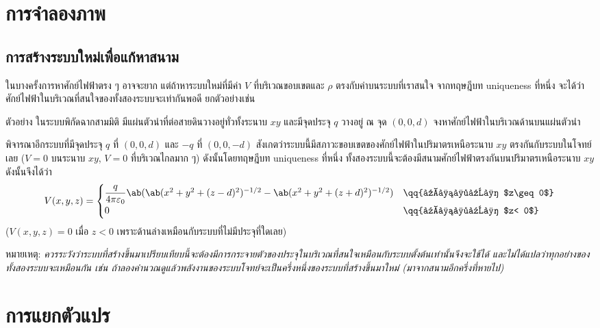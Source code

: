 \section{การจำลองภาพ}
\subsection{การสร้างระบบใหม่เพื่อแก้หาสนาม}
ในบางครั้งการหาศักย์ไฟฟ้าตรง ๆ อาจจะยาก แต่ถ้าหาระบบใหม่ที่มีค่า $V$ ที่บริเวณขอบเขตและ $\rho$ ตรงกับค่าบนระบบที่เราสนใจ จากทฤษฎีบท uniqueness ที่หนึ่ง จะได้ว่าศักย์ไฟฟ้าในบริเวณที่สนใจของทั้งสองระบบจะเท่ากันพอดี ยกตัวอย่างเช่น

\begin{corbox}{ตัวอย่าง}
    ในระบบพิกัดฉากสามมิติ มีแผ่นตัวนำที่ต่อสายดินวางอยู่ทั่วทั้งระนาบ $xy$ และมีจุดประจุ $q$ วางอยู่ ณ จุด $(0,0,d)$ จงหาศักย์ไฟฟ้าในบริเวณด้านบนแผ่นตัวนำ
\end{corbox}
\begin{soln}
    พิจารณาอีกระบบที่มีจุดประจุ $q$ ที่ $(0,0,d)$ และ $-q$ ที่ $(0,0,-d)$ สังเกตว่าระบบนี้มีสภาวะขอบเขตของศักย์ไฟฟ้าในปริมาตรเหนือระนาบ $xy$ ตรงกันกับระบบในโจทย์เลย ($V=0$ บนระนาบ $xy$, $V=0$ ที่บริเวณไกลมาก ๆ) ดังนั้นโดยทฤษฎีบท uniqueness ที่หนึ่ง ทั้งสองระบบนี้จะต้องมีสนามศักย์ไฟฟ้าตรงกันบนปริมาตรเหนือระนาบ $xy$\\
    ดังนั้นจึงได้ว่า
    \[
    V(x,y,z)=\begin{cases}
        \dfrac{q}{4\pi\eps_0}\ab(\ab(x^2+y^2+(z-d)^2)^{-1/2}-\ab(x^2+y^2+(z+d)^2)^{-1/2})&\qq{เมื่อ $z\geq0$}\\
        0&\qq{เมื่อ $z< 0$}
    \end{cases}
    \]
    ($V(x,y,z)=0$ เมื่อ $z<0$ เพราะด้านล่างเหมือนกับระบบที่ไม่มีประจุที่ใดเลย)
\end{soln}
หมายเหตุ: \emph{ควรระวังว่าระบบที่สร้างขึ้นมาเปรียบเทียบนี้จะต้องมีการกระจายตัวของประจุในบริเวณที่สนใจเหมือนกับระบบตั้งต้นเท่านั้นจึงจะใช้ได้ และไม่ได้แปลว่าทุกอย่างของทั้งสองระบบจะเหมือนกัน เช่น ถ้าลองคำนวณดูแล้วพลังงานของระบบโจทย์จะเป็นครึ่งหนึ่งของระบบที่สร้างขึ้นมาใหม่ (มาจากสนามอีกครึ่งที่หายไป)}
\section{การแยกตัวแปร}
